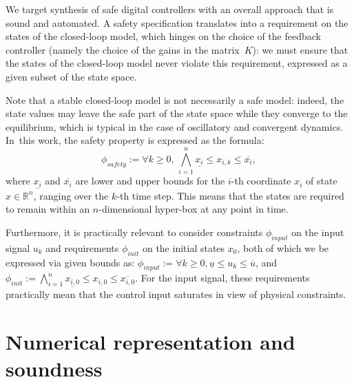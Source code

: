 \documentclass[twocolumn]{autart}    %
\newcommand{\addtodo}[1]{\textcolor{red}{[#1]}}
\begin{document}
We target synthesis of safe digital controllers with an overall approach that is sound and automated.
A safety specification translates into a requirement on the states of the closed-loop model, 
which hinges on the choice of the feedback controller (namely the choice of the gains in the matrix~$K$):  
we must ensure that the states of the closed-loop model never violate this requirement, expressed as a given subset of the state space.  

Note that a stable closed-loop model is not necessarily a safe model: 
indeed, the state values may leave the safe part of the state space while they converge
to the equilibrium, which is typical in the case of oscillatory and convergent dynamics. 
In~this work, the safety property is expressed as the formula:
%
\begin{equation}
\label{eq:safetyliteral}
\phi_\mathit{safety} := \forall k\ge 0,\, \bigwedge_{i=1}^{n}{\underline{x_{i}} \leq x_{i,k} \leq \overline{x_{i}}},
\end{equation}
%
%
where $\underline{x_{i}}$ and $\overline{x_{i}}$ are lower and upper bounds
for the $i$-th coordinate $x_{i}$ of state $x\in \mathbb R^n$, ranging over the $k$-th time step.  
This means that the states are required to remain within an $n$-dimensional hyper-box at any point in time.  	

Furthermore, it is practically relevant to consider constraints $\phi_\mathit{input}$ on the input
signal $u_{k}$ and requirements $\phi_\mathit{init}$ on the initial states $x_0$, 
both of which we be expressed via given bounds as: 
$\phi_\mathit{input} := {\forall k\ge 0, \underline{u} \leq u_{k} \leq \overline{u}} $, 
and $\phi_\mathit{init} := \bigwedge_{i=1}^{n} \underline{x_{i,0}} \leq x_{i,0} \leq \overline{x_{i,0}}$. 
For the input signal, these requirements practically mean that the control input saturates in view of physical constraints. 
\fi

\section{Numerical representation and soundness} 
\label{sec:numeric_rep}
\end{document}
